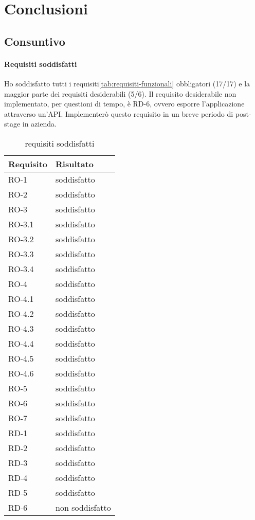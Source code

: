 
\chapter{Conclusioni}
\label{cap:conclusioni}

\section{Consuntivo}
\subsubsection{Requisiti soddisfatti}
Ho soddisfatto tutti i requisiti\ref{tab:requisiti-funzionali} obbligatori (17/17) e la maggior parte dei requisiti desiderabili (5/6). Il requisito desiderabile non implementato, per questioni di tempo, è RD-6, ovvero esporre l'applicazione attraverso un'API. Implementerò questo requisito in un breve periodo di post-stage in azienda.
\label{tab:requisiti-resoconto}
\begin{longtable}{|l l|}
\caption{requisiti soddisfatti}\\
\hline
\textbf{Requisito} & \textbf{Risultato} \\
\hline
RO-1     & soddisfatto\\
RO-2     & soddisfatto\\
RO-3     & soddisfatto\\
RO-3.1   & soddisfatto\\
RO-3.2   & soddisfatto\\
RO-3.3   & soddisfatto\\
RO-3.4   & soddisfatto\\
RO-4     & soddisfatto\\
RO-4.1   & soddisfatto\\
RO-4.2   & soddisfatto\\
RO-4.3   & soddisfatto\\
RO-4.4   & soddisfatto\\
RO-4.5   & soddisfatto\\
RO-4.6   & soddisfatto\\
RO-5     & soddisfatto\\
RO-6     & soddisfatto\\
RO-7     & soddisfatto\\
RD-1     & soddisfatto\\
RD-2     & soddisfatto\\
RD-3     & soddisfatto\\
RD-4     & soddisfatto\\
RD-5     & soddisfatto\\
RD-6     & non soddisfatto\\
\hline
\end{longtable}

